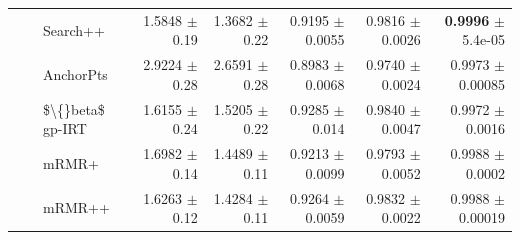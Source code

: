 \begin{longtable}{llp{}rrrrr}
 &  & Search++ & 1.5848 {\scriptsize $\pm$ 0.19} & 1.3682 {\scriptsize $\pm$ 0.22} & 0.9195 {\scriptsize $\pm$ 0.0055} & 0.9816 {\scriptsize $\pm$ 0.0026} & \textbf{0.9996} {\scriptsize $\pm$ 5.4e-05} \\
 &  & AnchorPts & 2.9224 {\scriptsize $\pm$ 0.28} & 2.6591 {\scriptsize $\pm$ 0.28} & 0.8983 {\scriptsize $\pm$ 0.0068} & 0.9740 {\scriptsize $\pm$ 0.0024} & 0.9973 {\scriptsize $\pm$ 0.00085} \\
 &  & \$\textbackslash\{\}beta\$ gp-IRT & 1.6155 {\scriptsize $\pm$ 0.24} & 1.5205 {\scriptsize $\pm$ 0.22} & 0.9285 {\scriptsize $\pm$ 0.014} & 0.9840 {\scriptsize $\pm$ 0.0047} & 0.9972 {\scriptsize $\pm$ 0.0016} \\
 &  & mRMR+ & 1.6982 {\scriptsize $\pm$ 0.14} & 1.4489 {\scriptsize $\pm$ 0.11} & 0.9213 {\scriptsize $\pm$ 0.0099} & 0.9793 {\scriptsize $\pm$ 0.0052} & 0.9988 {\scriptsize $\pm$ 0.0002} \\
 &  & mRMR++ & 1.6263 {\scriptsize $\pm$ 0.12} & 1.4284 {\scriptsize $\pm$ 0.11} & 0.9264 {\scriptsize $\pm$ 0.0059} & 0.9832 {\scriptsize $\pm$ 0.0022} & 0.9988 {\scriptsize $\pm$ 0.00019} \\
\end{longtable}